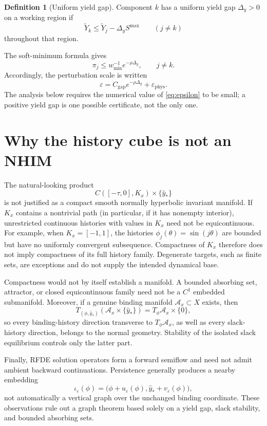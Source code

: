 \documentclass[11pt]{article}
\theoremstyle{definition}
\newtheorem{definition}{Definition}
\theoremstyle{remark}
\begin{document}
\begin{definition}[Uniform yield gap]
\label{def:gap}
Component $k$ has a uniform yield gap $\Delta_y>0$ on a working region if
\[
\widetilde Y_k\le \widetilde Y_j-\Delta_y S^{\max}
\qquad (j\ne k)
\]
throughout that region.
\end{definition}

The soft-minimum formula gives
\[
\pi_j\le w_{\min}^{-1}e^{-\rho\Delta_y},\qquad j\ne k.
\]
Accordingly, the perturbation scale is written
\begin{equation}
\varepsilon=C_{\mathrm{gap}}e^{-\rho\Delta_y}+\varepsilon_{\mathrm{phys}}.
\label{eq:epsilon}
\end{equation}
The analysis below requires the numerical value of \eqref{eq:epsilon} to be small; a positive yield gap is one possible certificate, not the only one.

\section{Why the history cube is not an NHIM}
\label{sec:diagnosis}

The natural-looking product
\[
C([ -\tau,0],K_x)\times\{\widehat y_*\}
\label{eq:cube}
\]
is not justified as a compact smooth normally hyperbolic invariant manifold. If $K_x$ contains a nontrivial path (in particular, if it has nonempty interior), unrestricted continuous histories with values in $K_x$ need not be equicontinuous. For example, when $K_x=[-1,1]$, the histories $\phi_j(\theta)=\sin(j\theta)$ are bounded but have no uniformly convergent subsequence. Compactness of $K_x$ therefore does not imply compactness of its full history family. Degenerate targets, such as finite sets, are exceptions and do not supply the intended dynamical base.

Compactness would not by itself establish a manifold. A bounded absorbing set, attractor, or closed equicontinuous family need not be a $C^1$ embedded submanifold. Moreover, if a genuine binding manifold $\mathcal A_x\subset X$ exists, then
\[
T_{(\phi,\widehat y_*)}(\mathcal A_x\times\{\widehat y_*\})
=T_\phi\mathcal A_x\times\{0\},
\]
so every binding-history direction transverse to $T_\phi\mathcal A_x$, as well as every slack-history direction, belongs to the normal geometry. Stability of the isolated slack equilibrium controls only the latter part.

Finally, RFDE solution operators form a forward semiflow and need not admit ambient backward continuations. Persistence generally produces a nearby embedding
\[
\iota_\varepsilon(\phi)
=\bigl(\phi+u_\varepsilon(\phi),\widehat y_*+v_\varepsilon(\phi)\bigr),
\]
not automatically a vertical graph over the unchanged binding coordinate. These observations rule out a graph theorem based solely on a yield gap, slack stability, and bounded absorbing sets.
\end{document}
